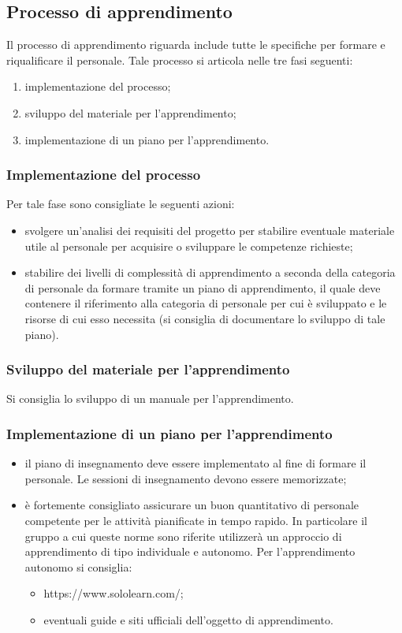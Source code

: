 \subsection{Processo di apprendimento}
Il processo di apprendimento riguarda include tutte le specifiche per formare e riqualificare il personale. Tale processo si articola nelle tre fasi seguenti:

\begin{enumerate}
    \item implementazione del processo;
    \item sviluppo del materiale per l'apprendimento;
    \item implementazione di un piano per l'apprendimento.
\end{enumerate}

\subsubsection{Implementazione del processo}Per tale fase sono consigliate le seguenti azioni:
\begin{itemize}
    \item svolgere un'analisi dei requisiti del progetto per stabilire eventuale materiale utile al personale per acquisire o sviluppare le competenze richieste;
    \item stabilire dei livelli di complessità di apprendimento a seconda della categoria di personale da  formare tramite un piano di apprendimento, il quale deve contenere il riferimento alla categoria di personale per cui è sviluppato e le risorse di cui esso necessita (si consiglia di documentare lo sviluppo di tale piano).
\end{itemize}


\subsubsection{Sviluppo del materiale per l'apprendimento}
Si consiglia lo sviluppo di un manuale per l'apprendimento.

\subsubsection{Implementazione di un piano per l'apprendimento}
\begin{itemize}
    \item il piano di insegnamento deve essere implementato al fine di formare il personale. Le sessioni di insegnamento devono essere memorizzate;
    \item è fortemente consigliato assicurare un buon quantitativo di personale competente per le attività pianificate in tempo rapido.
    In particolare il gruppo a cui queste norme sono riferite utilizzerà un approccio di apprendimento di tipo individuale e autonomo. Per l'apprendimento autonomo si consiglia:
    \begin{itemize}
        \item  https://www.sololearn.com/;
        \item eventuali guide e siti ufficiali dell'oggetto di apprendimento.
    \end{itemize}
\end{itemize}


